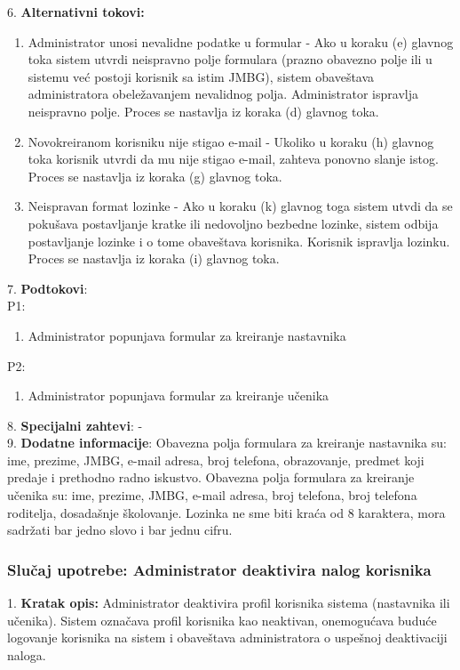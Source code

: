 \documentclass{article}
\begin{document}
6. \textbf{Alternativni tokovi:}
\begin{enumerate} [label=(\roman*)]
\item Administrator unosi nevalidne podatke u formular - Ako u koraku (e) glavnog toka sistem utvrdi neispravno polje formulara (prazno obavezno polje ili u sistemu već postoji korisnik sa istim JMBG), sistem obaveštava administratora obeležavanjem nevalidnog polja. Administrator ispravlja neispravno polje. Proces se nastavlja iz koraka (d) glavnog toka.
\item Novokreiranom korisniku nije stigao e-mail - Ukoliko u koraku (h) glavnog toka korisnik utvrdi da mu nije stigao e-mail, zahteva ponovno slanje istog. Proces se nastavlja iz koraka (g) glavnog toka.
\item Neispravan format lozinke - Ako u koraku (k) glavnog toga sistem utvdi da se pokušava postavljanje kratke ili nedovoljno bezbedne lozinke, sistem odbija postavljanje lozinke i o tome obaveštava korisnika. Korisnik ispravlja lozinku. Proces se nastavlja iz koraka (i) glavnog toka.
\end{enumerate}

7. \textbf{Podtokovi}: \\
P1:
\begin{enumerate} [label=(\alph*)]
\item Administrator popunjava formular za kreiranje nastavnika
\end{enumerate}
P2:
\begin{enumerate} [label=(\alph*)]
\item Administrator popunjava formular za kreiranje učenika
\end{enumerate}

8. \textbf{Specijalni zahtevi}: - \\

9. \textbf{Dodatne informacije}: Obavezna polja formulara za kreiranje nastavnika su: ime, prezime, JMBG, e-mail adresa, broj telefona, obrazovanje, predmet koji predaje i prethodno radno iskustvo. Obavezna polja formulara za kreiranje učenika su: ime, prezime, JMBG, e-mail adresa, broj telefona, broj telefona roditelja, dosadašnje školovanje. Lozinka ne sme biti kraća od 8 karaktera, mora sadržati bar jedno slovo i bar jednu cifru. \\

\subsubsection{Slučaj upotrebe: Administrator deaktivira nalog korisnika}
1. \textbf{Kratak opis:} Administrator deaktivira profil korisnika sistema (nastavnika ili učenika). Sistem označava profil korisnika kao neaktivan, onemogućava buduće logovanje korisnika na sistem i obaveštava administratora o uspešnoj deaktivaciji naloga. \\
\end{document}
